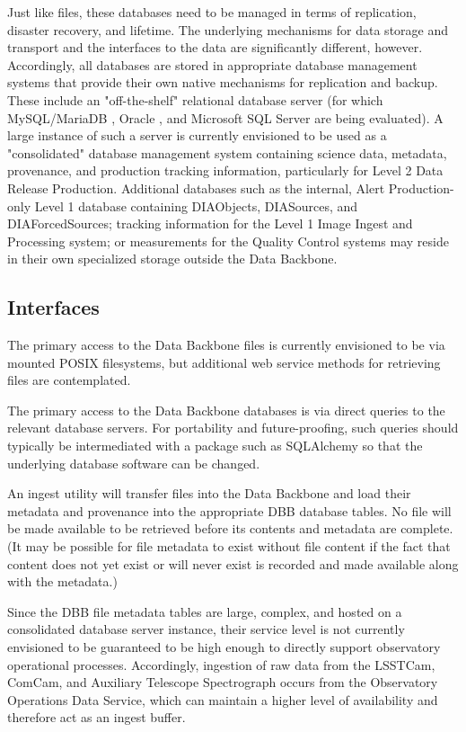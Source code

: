 \documentclass[DM,toc]{lsstdoc}
\begin{document}
Just like files, these databases need to be managed in terms of replication,
disaster recovery, and lifetime.  The underlying mechanisms for data storage
and transport and the interfaces to the data are significantly different,
however.  Accordingly, all databases are stored in appropriate database
management systems that provide their own native mechanisms for replication and
backup.
These include an "off-the-shelf" relational database server (for which MySQL/MariaDB \citep{MariaDB}, Oracle \citep{Oracle}, and Microsoft SQL Server \citep{SQLServer} are being evaluated).
A large instance of such a server is currently envisioned to be used as a "consolidated" database management system containing science data, metadata, provenance, and production tracking information, particularly for Level 2 Data Release Production.
Additional databases such as the internal, Alert Production-only Level 1 database containing DIAObjects, DIASources, and DIAForcedSources; tracking information for the Level 1 Image Ingest and Processing system; or measurements for the Quality Control systems may reside in their own specialized storage outside the Data Backbone.

\subsection{Interfaces}\label{dbb-interfaces}

The primary access to the Data Backbone files is currently envisioned to be via mounted POSIX filesystems, but additional web service methods for retrieving files are contemplated.

The primary access to the Data Backbone databases is via direct queries to the relevant database servers.
For portability and future-proofing, such queries should typically be intermediated with a package such as SQLAlchemy so that the underlying database software can be changed.

An ingest utility will transfer files into the Data Backbone and load their metadata and provenance into the appropriate DBB database tables.
No file will be made available to be retrieved before its contents and metadata are complete.
(It may be possible for file metadata to exist without file content if the fact that content does not yet exist or will never exist is recorded and made available along with the metadata.)

Since the DBB file metadata tables are large, complex, and hosted on a consolidated database server instance, their service level is not currently envisioned to be guaranteed to be high enough to directly support observatory operational processes.
Accordingly, ingestion of raw data from the LSSTCam, ComCam, and Auxiliary Telescope Spectrograph occurs from the Observatory Operations Data Service, which can maintain a higher level of availability and therefore act as an ingest buffer.
\end{document}
